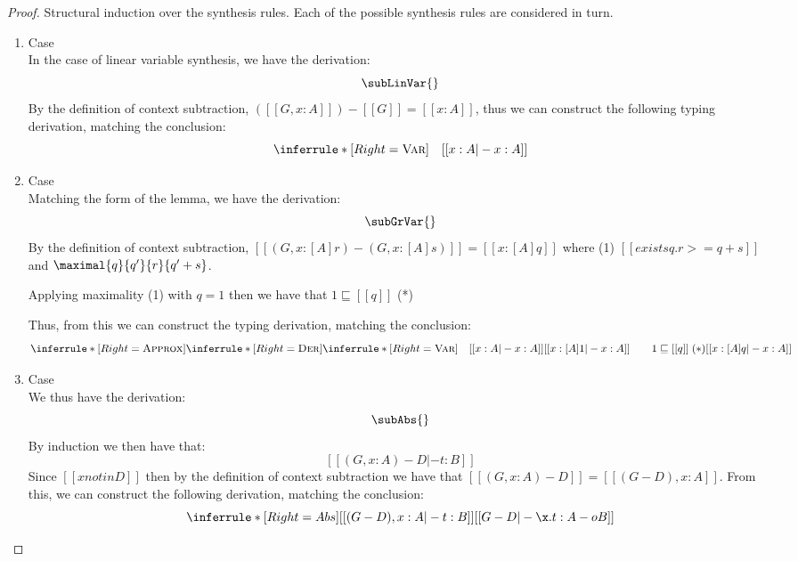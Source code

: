 \subSynthSound*

\begin{proof}
Structural induction over the synthesis rules. Each of the possible synthesis
rules are considered in turn.

\begin{enumerate}[itemsep=1em]
  \item Case \subLinVarName \\
  In the case of linear variable synthesis, we have the derivation:
  \[
    \subLinVar{}
  \]
  By the definition of context subtraction,
  $([[G, x : A]]) - [[ G ]] = [[ x : A]]$, thus we
  can construct the following typing derivation, matching the
  conclusion:
  \[
    \inferrule*[Right=\textsc{Var}]
    {\quad}
    {[[ x : A |- x : A ]]}
  \]

\item Case \subGrVarName{} \\
    Matching the form of the lemma, we have the derivation:
    \[
    \subGrVar{}
    \]
    By the definition of context subtraction,
    $ [[ (G, x : [A]r) - (G, x : [A]s) ]] = [[ x : [A] q ]]$
    where (1) $[[ exists q . r >= q + s ]]$ and $\maximal{q}{q'}{r}{q' + s}$.

    Applying maximality (1) with $q = 1$ then we have that $1 \sqsubseteq [[ q ]]$ (*)

    Thus, from this we can construct the typing derivation, matching the conclusion:
    \[
    \inferrule*[Right=\textsc{Approx}]
    {
      \inferrule*[Right=\textsc{Der}]
        {\inferrule*[Right=\textsc{Var}]
          {\quad}
          {[[ x : A |- x : A ]]}
        }
        {[[ x : [A] 1 |- x : A ]] \qquad 1 \sqsubseteq [[ q ]] \; (*)}
    }{
      [[ x : [A] q |- x : A ]]
    }
    \]

  \item Case \subAbsName \\
    We thus have the derivation:
    \[
    \subAbs{}
    \]
    By induction we then have that:
    \[
      [[ (G, x : A) - D |- t : B ]]
    \]
    Since $[[x notin D]]$ then by the definition of context
    subtraction we have that $[[ (G, x : A) - D ]] = [[ (G - D), x : A ]]$.
    From this, we can construct the following derivation, matching the
    conclusion:
    \[
    \inferrule*[Right=Abs]
    {[[ (G - D) , x : A |- t : B]]}{[[ G - D |- \x. t : A -o B ]]}
    \]



\end{enumerate}
\end{proof}
